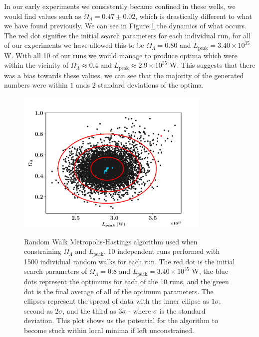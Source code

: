 \documentclass[twocolumn]{revtex4}
\begin{document}
{In our early experiments we consistently became confined in these wells, we would find values such as $\Omega_\Lambda=0.47\pm0.02$, which is drastically different to what we have found previously. We can see in Figure \ref{fig:mcmc_search} the dynamics of what occurs. The red dot signifies the initial search parameters for each individual run, for all of our experiments we have allowed this to be $\Omega_\Lambda=0.80$ and $L_\text{peak}=3.40\times10^{35}$ W. With all 10 of our runs we would manage to produce optima which were within the vicinity of $\Omega_\Lambda \approx 0.4$ and $L_\text{peak}\approx2.9\times10^{35}$ W. This suggests that there was a bias towards these values, we can see that the majority of the generated numbers were within $1$ ands $2$ standard deviations of the optima.

\begin{figure}[!h]
\begin{center}
\includegraphics[width=9.25cm]{results/ol_lp_complete}
\caption[]{Random Walk Metropolis-Hastings algorithm used when constraining $\Omega_\Lambda$ and $L_\text{peak}$. 10 independent runs performed with 1500 individual random walks for each run. The red dot is the initial search parameters of $\Omega_\Lambda=0.8$ and $L_\text{peak}=3.40\times10^{35}$ W, the blue dots represent the optimums for each of the 10 runs, and the green dot is the final average of all of the optimum parameters. The ellipses represent the spread of data with the inner ellipse as $1\sigma$, second as $2\sigma$, and the third as $3\sigma$ - where $\sigma$ is the standard deviation. This plot shows us the potential for the algorithm to become stuck within local minima if left unconstrained. }
\vspace{-5ex}
\label{fig:mcmc_search}
\end{center}
\end{figure}

}
\end{document}
